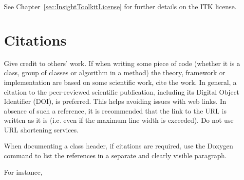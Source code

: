 See Chapter~\ref{sec:InsightToolkitLicense} for further details on the ITK
license.


\section{Citations}%
\label{sec:Citations}

Give credit to others' work. If when writing some piece of code (whether it is a
class, group of classes or algorithm in a method) the theory, framework or
implementation are based on some scientific work, cite the work. In general, a
citation to the peer-reviewed scientific publication, including its Digital
Object Identifier (DOI), is preferred. This helps avoiding issues with web
links. In absence of such a reference, it is recommended that the link to the
URL is written as it is (i.e. even if the maximum line width is exceeded). Do
not use URL shortening services.

When documenting a class header, if citations are required, use the Doxygen
 command to list the references in a separate and clearly
visible paragraph.

For instance,

